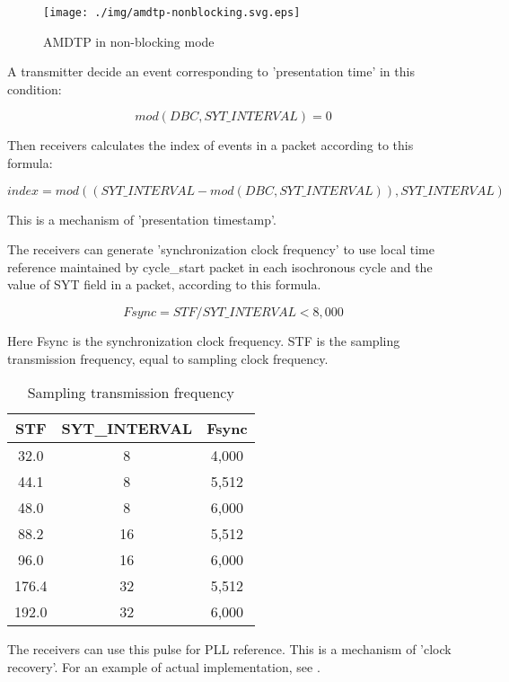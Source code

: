 \documentclass[onecolumn]{article}
\begin{document}
\begin{figure}[H]
	\centering
	\texttt{[image: ./img/amdtp-nonblocking.svg.eps]}
	\caption{{AMDTP in non-blocking mode}}
	\label{amdtp-nonblockingstart}
\end{figure}

A transmitter decide an event corresponding to 'presentation time' in this condition:

\begin{equation}
	mod(DBC, SYT\_INTERVAL) = 0
\end{equation}

Then receivers calculates the index of events in a packet according to this formula:

\begin{equation}
	index = mod((SYT\_INTERVAL - mod(DBC, SYT\_INTERVAL)), SYT\_INTERVAL)
\end{equation}

This is a mechanism of 'presentation timestamp'.

The receivers can generate 'synchronization clock frequency' to use local time reference maintained by cycle\_start packet in each isochronous cycle and the value of SYT field in a packet, according to this formula.

\begin{equation}
	Fsync = STF / SYT\_INTERVAL < 8,000
\end{equation}

Here Fsync is the synchronization clock frequency. STF is the sampling transmission frequency, equal to sampling clock frequency.

\begin{table}[H]
	\centering
	\caption{{Sampling transmission frequency}}
	\label{fsync}
	\begin{tabular}{ccc} \toprule
		STF & SYT\_INTERVAL & Fsync \\ \midrule
		32.0	& 8	& 4,000 \\
		44.1	& 8	& 5,512 \\
		48.0	& 8	& 6,000 \\
		88.2	& 16	& 5,512 \\
		96.0	& 16	& 6,000 \\
		176.4	& 32	& 5,512 \\
		192.0	& 32	& 6,000 \\ \bottomrule
	\end{tabular}
\end{table}

The receivers can use this pulse for PLL reference. This is a mechanism of 'clock recovery'. For an example of actual implementation, see \cite{icelynx}.
\end{document}
